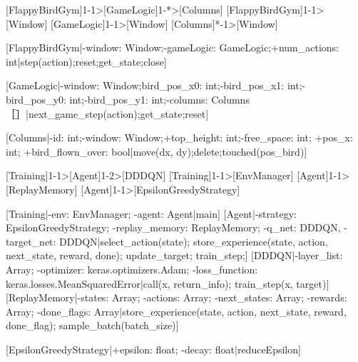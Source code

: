 

[FlappyBirdGym]1-1>[GameLogic]1-*>[Columns]
[FlappyBirdGym]1-1>[Window]
[GameLogic]1-1>[Window]
[Columns]*-1>[Window]

[FlappyBirdGym|-window: Window;-gameLogic: GameLogic;+num_actions: int|step(action);reset;get_state;close]

[GameLogic|-window: Window;bird_pos_x0: int;-bird_pos_x1: int;-bird_pos_y0: int;-bird_pos_y1: int;-columns: Columns［］|next_game_step(action);get_state;reset]

[Columns|-id: int;-window: Window;+top_height: int;-free_space: int; +pos_x: int; +bird_flown_over: bool|move(dx, dy);delete;touched(pos_bird)]

[Training]1-1>[Agent]1-2>[DDDQN]
[Training]1-1>[EnvManager]
[Agent]1-1>[ReplayMemory]
[Agent]1-1>[EpsilonGreedyStrategy]

[Training|-env: EnvManager; -agent: Agent|main]
[Agent|-strategy: EpsilonGreedyStrategy; -replay_memory: ReplayMemory; -q_net: DDDQN, -target_net: DDDQN|select_action(state); store_experience(state, action, next_state, reward, done); update_target; train_step;]
[DDDQN|-layer_list: Array; -optimizer: keras.optimizers.Adam; -loss_function: keras.losses.MeanSquaredError|call(x, return_info); train_step(x, target)]
[ReplayMemory|-states: Array; -actions: Array; -next_states: Array; -rewards: Array; -done_flags: Array|store_experience(state, action, next_state, reward, done_flag); sample_batch(batch_size)]

[EpsilonGreedyStrategy|+epsilon: float; -decay: float|reduceEpsilon]